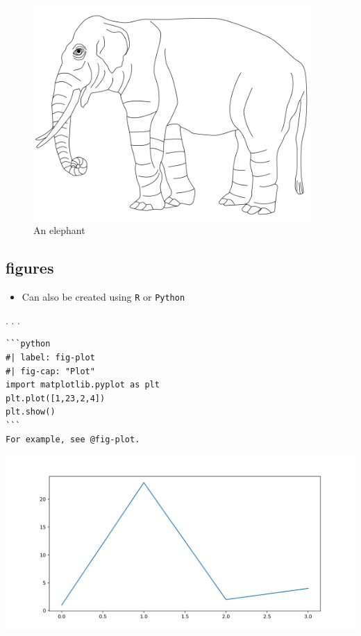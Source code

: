 \documentclass[
  letterpaper,
  DIV=11,
  numbers=noendperiod]{scrartcl}
\providecommand{\tightlist}{%
  \setlength{\itemsep}{0pt}\setlength{\parskip}{0pt}}\usepackage{longtable,booktabs,array}
\begin{document}
\begin{figure}[H]

{\centering \includegraphics[width=4.16667in,height=\textheight]{img/elephant.png}

}

\caption{An elephant}

\end{figure}%

\subsection{figures}\label{figures-1}

\begin{itemize}
\tightlist
\item
  Can also be created using \texttt{R} or \texttt{Python}
\end{itemize}

. . .

\begin{verbatim}
```python
#| label: fig-plot
#| fig-cap: "Plot"
import matplotlib.pyplot as plt
plt.plot([1,23,2,4])
plt.show()
```
For example, see @fig-plot.
\end{verbatim}

\begin{center}
\includegraphics[width=6.25in,height=\textheight]{img/python.png}
\end{center}
\end{document}
